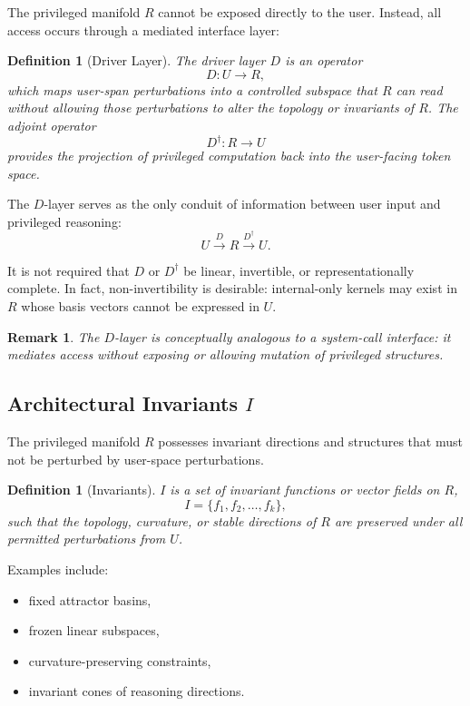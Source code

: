 \documentclass[11pt,a4paper]{article}
\newtheorem{definition}[theorem]{Definition}
\newtheorem*{remark}{Remark}
\begin{document}
The privileged manifold $R$ cannot be exposed directly to the user. Instead, all access occurs through a mediated interface layer:

\begin{definition}[Driver Layer]
The driver layer $D$ is an operator
\begin{equation}
D: U \to R,
\end{equation}
which maps user-span perturbations into a controlled subspace that $R$ can read without allowing those perturbations to alter the topology or invariants of $R$. The adjoint operator
\begin{equation}
D^\dagger: R \to U
\end{equation}
provides the projection of privileged computation back into the user-facing token space.
\end{definition}

The $D$-layer serves as the only conduit of information between user input and privileged reasoning:
\[
U \xrightarrow{D} R \xrightarrow{D^\dagger} U.
\]

It is not required that $D$ or $D^\dagger$ be linear, invertible, or representationally complete. In fact, non-invertibility is desirable: internal-only kernels may exist in $R$ whose basis vectors cannot be expressed in $U$.

\begin{remark}
The $D$-layer is conceptually analogous to a system-call interface: it mediates access without exposing or allowing mutation of privileged structures.
\end{remark}

\subsection{Architectural Invariants $I$}

The privileged manifold $R$ possesses invariant directions and structures that must not be perturbed by user-space perturbations.

\begin{definition}[Invariants]
$I$ is a set of invariant functions or vector fields on $R$,
\begin{equation}
I = \{f_1, f_2, \ldots, f_k\},
\end{equation}
such that the topology, curvature, or stable directions of $R$ are preserved under all permitted perturbations from $U$.
\end{definition}

Examples include:
\begin{itemize}
    \item fixed attractor basins,
    \item frozen linear subspaces,
    \item curvature-preserving constraints,
    \item invariant cones of reasoning directions.
\end{itemize}
\end{document}
